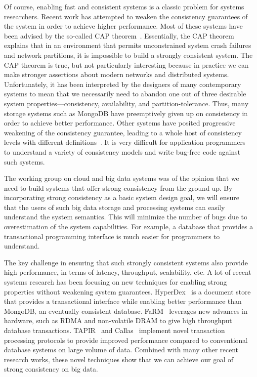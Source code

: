 Of course, enabling fast and consistent systems is a classic problem for
systems researchers.  Recent work has attempted to weaken the consistency
guarantees of the system in order to achieve higher performance.  Most of these
systems have been advised by the so-called CAP theorem~\cite{cap}.
Essentially, the CAP theorem explains that in an environment that permits
unconstrained system crash failures and network partitions, it is impossible to
build a strongly consistent system.  The CAP theorem is true, but not
particularly interesting because in practice we can make stronger assertions
about modern networks and distributed systems.  Unfortunately, it has been
interpreted by the designers of many contemporary systems to mean that we
necessarily need to abandon one out of three desirable system
properties---consistency, availability, and partition-tolerance.  Thus, many
storage systems such as MongoDB have preemptively given up on consistency in
order to achieve better performance.  Other systems have posited progressive
weakening of the consistency guarantee, leading to a whole host of consistency
levels with different definitions~\cite{vogels_consistency}.  It is very
difficult for application programmers to understand a variety of consistency
models and write bug-free code against such systems.

The working group on cloud and big data systems was of the opinion that we need
to build systems that offer strong consistency from the ground up.  By
incorporating strong consistency as a basic system design goal, we will ensure
that the users of such big data storage and processing systems can easily
understand the system semantics.  This will minimize the number of bugs due to
overestimation of the system capabilities.  For example, a database that
provides a transactional programming interface is much easier for programmers
to understand.

The key challenge in ensuring that such strongly consistent systems also
provide high performance, in terms of latency, throughput, scalability, etc.  A
lot of recent systems research has been focusing on new techniques for enabling
strong properties without weakening system guarantees.
HyperDex~\cite{HyperDex} is a document store that provides a transactional
interface while enabling better performance than MongoDB, an eventually
consistent database.  FaRM~\cite{farm} leverages new advances in hardware, such
as RDMA and non-volatile DRAM to give high throughput database transactions.
TAPIR~\cite{tapir} and Callas~\cite{callas} implement novel transaction
processing protocols to provide improved performance compared to conventional
database systems on large volume of data.  Combined with many other recent
research works, these novel techniques show that we can achieve our goal of
strong consistency on big data.

